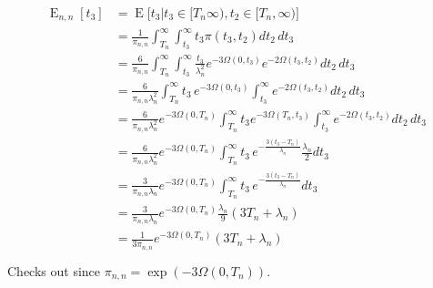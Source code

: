 \documentclass{article}
\DeclareMathOperator{\E}{E}
\begin{document}
\begin{align}
    \begin{split}
        \E_{n,n}[t_3] &= \E\big[t_3|t_3 \in [T_n \infty),t_2 \in [T_n,\infty) \big]\\
                      &= \frac{1}{\pi_{n,n}}\int_{T_n}^{\infty}\int_{t_3}^{\infty}t_3\pi(t_3,t_2)dt_2\,dt_3\\
                      &= \frac{6}{\pi_{n,n}}\int_{T_n}^{\infty}\int_{t_3}^{\infty}
                        \frac{t_3}{\lambda_n^2}e^{-3\Omega(0,t_3)}e^{-2\Omega(t_3,t_2)}dt_2\,dt_3\\
                      &= \frac{6}{\pi_{n,n}\lambda_n^2}\int_{T_n}^{\infty}
                        t_3\,e^{-3\Omega(0,t_3)}\int_{t_3}^{\infty}e^{-2\Omega(t_3,t_2)}dt_2\,dt_3\\
                    &= \frac{6}{\pi_{n,n}\lambda_n^2}e^{-3\Omega(0,T_n)}\int_{T_n}^{\infty}
                        t_3e^{-3\Omega(T_n,t_3)}\int_{t_3}^{\infty}e^{-2\Omega(t_3,t_2)}dt_2\,dt_3\\
                    &= \frac{6}{\pi_{n,n}\lambda_n^2}e^{-3\Omega(0,T_n)}
                        \int_{T_n}^{\infty}
                        t_3\,e^{-\frac{3(t_3-T_n)}{\lambda_n}}
                        \frac{\lambda_n}{2}dt_3\\
                    &= \frac{3}{\pi_{n,n}\lambda_n}e^{-3\Omega(0,T_n)}
                        \int_{T_n}^{\infty}
                        t_3\,e^{-\frac{3(t_3-T_n)}{\lambda_n}}
                        dt_3\\
                    &= \frac{3}{\pi_{n,n}\lambda_n}e^{-3\Omega(0,T_n)}
                        \frac{\lambda_n}{9}(3T_n+\lambda_n)\\
                    &= \frac{1}{3\pi_{n,n}}e^{-3\Omega(0,T_n)}
                        (3T_n+\lambda_n)\\
    \end{split}
\end{align}
Checks out since $\pi_{n,n} = \exp(-3\Omega(0,T_n))$.
\end{document}
